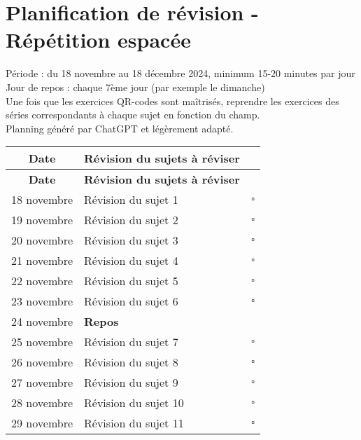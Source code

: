 \documentclass[a4paper,12pt]{report}
\begin{document}
\section*{Planification de révision - Répétition espacée}

\noindent Période : du 18 novembre au 18 décembre 2024, minimum 15-20 minutes par jour \\
Jour de repos : chaque 7ème jour (par exemple le dimanche) \\
Une fois que les exercices QR-codes sont maîtrisés, reprendre les exercices des séries correspondants à chaque sujet en fonction du champ.\\
Planning généré par ChatGPT et légèrement adapté.

\begin{longtable}{|c|p{8cm}|c|}
\hline
\textbf{Date} & \textbf{Révision du sujets à réviser} &\\
\hline
\endfirsthead
\hline
\textbf{Date} & \textbf{Révision du sujets à réviser} &\\
\hline
\endhead
18 novembre & Révision du sujet 1 & $\square$\\
\hline
19 novembre & Révision du sujet 2 & $\square$\\

\hline
20 novembre & Révision du sujet 3 & $\square$\\

\hline
21 novembre & Révision du sujet 4 & $\square$\\

\hline
22 novembre & Révision du sujet 5 & $\square$\\

\hline
23 novembre & Révision du sujet 6 & $\square$\\

\hline
24 novembre & \textbf{Repos} \\
\hline
25 novembre & Révision du sujet 7 & $\square$\\

\hline
26 novembre & Révision du sujet 8 & $\square$\\

\hline
27 novembre & Révision du sujet 9 & $\square$\\

\hline
28 novembre & Révision du sujet 10 & $\square$\\

\hline
29 novembre & Révision du sujet 11 & $\square$\\


\end{longtable}
\end{document}

